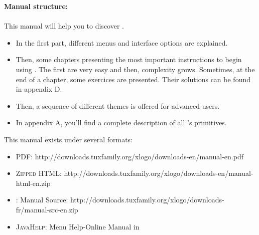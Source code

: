 \vspace{0.3cm}
\noindent \textbf{Manual structure:}\\ \\
This manual will help you to discover \xlogo.
\begin{itemize}
 \item In the first part, different menus and interface options are explained.
 \item Then, some chapters presenting the most important instructions to begin using \xlogo. The first are very easy and then, complexity grows. Sometimes, at the end of a chapter, some exercices are presented. Their solutions can be found in appendix D.
\item Then, a sequence of different themes is offered for advanced users.
\item In appendix A, you'll find a complete description of all \xlogo's primitives.
\end{itemize}
\vspace{0.5cm}
This manual exists under several formats:
\begin{itemize}
 \item \textsc{PDF}: http://downloads.tuxfamily.org/xlogo/downloads-en/manual-en.pdf
 \item \textsc{Zipped HTML}: http://downloads.tuxfamily.org/xlogo/downloads-en/manual-html-en.zip
 \item \LaTeXe: Manual Source: http://downloads.tuxfamily.org/xlogo/downloads-fr/manual-src-en.zip
 \item \textsc{JavaHelp}: Menu Help-Online Manual in \xlogo
\end{itemize}

